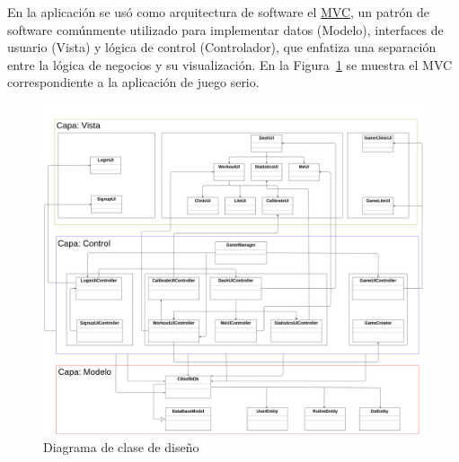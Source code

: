 En la aplicación se usó como arquitectura de software el \hyperlink{page: abbidx}{MVC}, un patrón de software comúnmente utilizado para implementar datos (Modelo), interfaces de usuario (Vista) y lógica de control (Controlador), que enfatiza una separación entre la lógica de negocios y su visualización. En la Figura~\ref{fig: software-architecture} se muestra el MVC correspondiente a la aplicación de juego serio.

\begin{figure}[ht]
    \centering
    \includegraphics[scale=0.18]{images/software-architecture.png}
    \caption{Diagrama de clase de diseño}
    \label{fig: software-architecture}
\end{figure}



